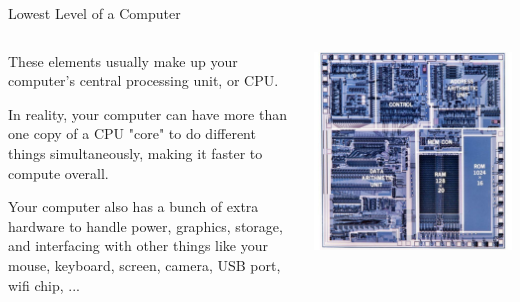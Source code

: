 \documentclass[]{beamer}
\begin{document}
\begin{frame}{Lowest Level of a Computer}



    \begin{columns}
        \begin{column}{0.5\textwidth}
            These elements usually make up your computer's central processing unit, or CPU.

            \vspace{\baselineskip}

            In reality, your computer can have more than one copy of a CPU "core" to do different things simultaneously, making it faster to compute overall.

            \vspace{\baselineskip}

            Your computer also has a bunch of extra hardware to handle power, graphics, storage, and interfacing with other things like your mouse, keyboard, screen, camera, USB port, wifi chip, ...
        \end{column}
        \begin{column}{0.5\textwidth}
            \includegraphics[width=\textwidth]{imgs/vis_5.jpg}
        \end{column}
    \end{columns}

\end{frame}
\end{document}
